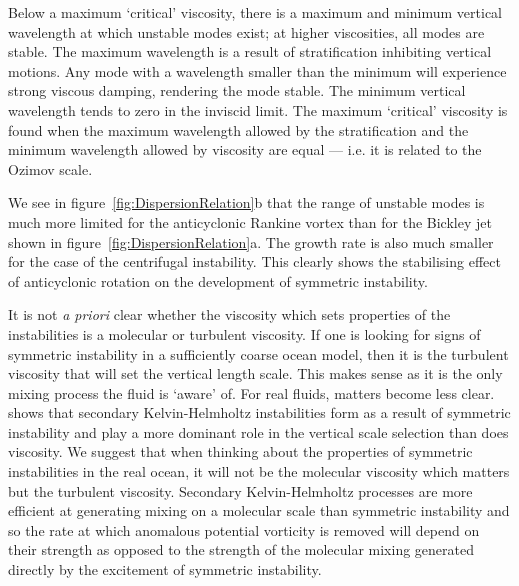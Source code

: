 Below a maximum `critical' viscosity, there is a maximum and minimum vertical wavelength at which unstable modes exist; at higher viscosities, all modes are stable. The maximum wavelength is a result of stratification inhibiting vertical motions. Any mode with a wavelength smaller than the minimum will experience strong viscous damping, rendering the mode stable. The minimum vertical wavelength tends to zero in the inviscid limit. The maximum `critical' viscosity is found when the maximum wavelength allowed by the stratification and the minimum wavelength allowed by viscosity are equal --- i.e. it is related to the Ozimov scale.

We see in figure~\ref{fig:DispersionRelation}b that the range of unstable modes is much more limited for the anticyclonic Rankine vortex than for the Bickley jet shown in figure~\ref{fig:DispersionRelation}a. The growth rate is also much smaller for the case of the centrifugal instability. This clearly shows the stabilising effect of anticyclonic rotation on the development of symmetric instability.

It is not \textit{a priori} clear whether the viscosity which sets properties of the instabilities is a molecular or turbulent viscosity. If one is looking for signs of symmetric instability in a sufficiently coarse ocean model, then it is the turbulent viscosity that will set the vertical length scale. This makes sense as it is the only mixing process the fluid is `aware' of. For real fluids, matters become less clear. \citet{Griffiths2003a} shows that secondary Kelvin-Helmholtz instabilities form as a result of symmetric instability and play a more dominant role in the vertical scale selection than does viscosity. We suggest that when thinking about the properties of symmetric instabilities in the real ocean, it will not be the molecular viscosity which matters but the turbulent viscosity. Secondary Kelvin-Helmholtz processes are more efficient at generating mixing on a molecular scale than symmetric instability and so the rate at which anomalous potential vorticity is removed will depend on their strength as opposed to the strength of the molecular mixing generated directly by the excitement of symmetric instability.

